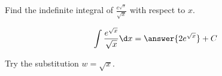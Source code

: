 \documentclass{ximera}
\author{Gregory Hartman \and Matthew Carr\and Nela Lakos \and Bobby Ramsey}
\begin{document}
\begin{exercise}

Find the indefinite integral of $\frac{e^{\sqrt{x}}}{\sqrt{x}}$ with respect to $x$.

\[
\int \frac{e^{\sqrt{x}}}{\sqrt{x}}\d x=\answer{2e^{\sqrt{x}}}+C
\]

\begin{hint}
	Try the substitution $w=\sqrt{x}$.
\end{hint}
\end{exercise}
\end{document}
